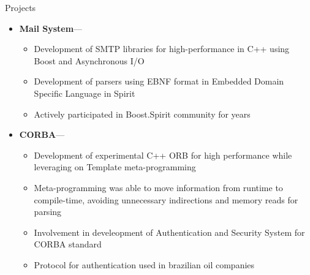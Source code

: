\documentclass[10pt,oneside]{article}
\newenvironment{ressection}[1]{
	\vspace{4pt}
	{\fontfamily{phv}\selectfont\Large#1}
	\begin{itemize}
	\vspace{3pt}
}{
	\end{itemize}
}
\newcommand{\ressubitem}[1]{
	\vspace{-1pt}
	\item \begin{flushleft} #1 \end{flushleft}
}
\newcommand{\resonelinebigitem}[2]{
	\vspace{-5pt}
	\item
	\textbf{#1}---#2
}
\newenvironment{resonelinesubsec}[2]{
	\resonelinebigitem{#1}{#2}
	\vspace{-2pt}
	\begin{itemize}
}{
	\end{itemize}
}
\begin{document}
\begin{ressection}{Projects}
  \begin{resonelinesubsec}{Mail System}{}
    \ressubitem{Development of SMTP libraries for high-performance in
      C++ using Boost and Asynchronous I/O}
    \ressubitem{Development of parsers using EBNF format in Embedded
      Domain Specific Language in Spirit}
    \ressubitem{Actively participated in Boost.Spirit community for years}
  \end{resonelinesubsec}

  \begin{resonelinesubsec}{CORBA}{}
    \ressubitem{Development of experimental C++ ORB for high
      performance while leveraging on Template meta-programming}
    \ressubitem{Meta-programming was able to move information from runtime to compile-time, avoiding unnecessary
      indirections and memory reads for parsing}
    \ressubitem{Involvement in develeopment of Authentication and
      Security System for CORBA standard}
    \ressubitem{Protocol for authentication used in brazilian oil companies}
  \end{resonelinesubsec}

  
\end{ressection}
\end{document}
